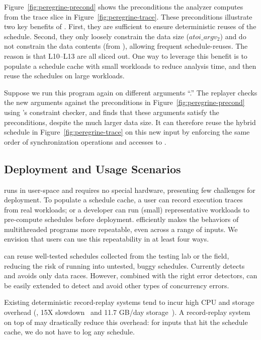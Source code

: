 Figure~\ref{fig:peregrine-precond} shows the preconditions the analyzer computes
from the trace slice in Figure~\ref{fig:peregrine-trace}.
These preconditions illustrate two key benefits of \peregrine.
First, they are sufficient to ensure deterministic reuses of the schedule.
Second, they only loosely constrain the data size ($atoi\_argv_2$) and do
not constrain the data contents (from ), allowing frequent
schedule-reuses.  The reason is that L10--L13 are all sliced out.
One way to leverage this benefit is to populate a
schedule cache with small workloads to reduce analysis time, and then
reuse the schedules on large workloads.

Suppose we run this program again on different arguments ``.''
The replayer checks the new arguments against the preconditions in
Figure~\ref{fig:peregrine-precond} using \klee's constraint checker, and finds that these
arguments satisfy the preconditions, despite the much larger data size.  
It can therefore reuse the hybrid schedule in Figure~\ref{fig:peregrine-trace}
on this new input by enforcing
the same order of synchronization operations and accesses
to .


\subsection{Deployment and Usage Scenarios} \label{sec:peregrine-deploy}

\peregrine runs in user-space and requires no special hardware, presenting few
challenges for deployment.  To populate a schedule cache, a user can
record execution traces from real workloads;
or a developer can run (small) representative workloads
to pre-compute schedules before deployment.  \peregrine
efficiently makes the behaviors of multithreaded programs more repeatable,
even across a range of inputs.  We envision that users can use this repeatability in
at least four ways.

 \peregrine can reuse well-tested schedules
collected from the testing lab or the field, reducing the risk of running
into untested, buggy schedules.  
Currently \peregrine detects and avoids only data races.  However, combined with
the right error detectors, \peregrine can be easily extended to detect and
avoid other types of concurrency errors.

 Existing deterministic record-replay systems
tend to incur high CPU and storage overhead (\eg, 15X
slowdown~\cite{idna:vee06} and 11.7 GB/day
storage~\cite{smp-revirt:vee08}).  A record-replay system on top of \peregrine
may drastically reduce this overhead: for inputs that hit the
schedule cache, we do not have to
log any schedule.

